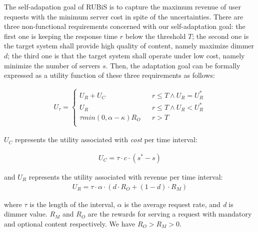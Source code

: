\documentclass[sigconf]{acmart}
\begin{document}
The self-adapation goal of RUBiS is to capture the maximum revenue of user requests with the minimum server cost in spite of the uncertainties. There are three non-functional requirements concerned with our self-adaptation goal: the first one is keeping the response time $r$ below the threshold $T$; the second one is the target system shall provide high quality of content, namely maximize dimmer $d$; the third one is that the target system shall operate under low cost, namely minimize the number of servers $s$. Then, the adaptation goal can be formally expressed as a utility function of these three requirements as follows:

\begin{equation}
\begin{aligned}
U_{\tau}=\left\{
\begin{array}{rcl}
U_{R}+U_{C} & & { r\leq T\wedge U_{R}=U_{R}^{*}} \\
U_{R} & & {r\leq T\wedge U_{R}<U_{R}^{*}}\\
\tau min(0,\alpha-\kappa)R_{O} & & {r>T}\\
\end{array} \right.
\end{aligned}
\end{equation}
	
\noindent$U_{C}$ represents the utility associated with \textit{cost} per time interval:
	
\begin{equation}
\begin{aligned}
U_{C}=\tau \cdot c\cdot (s^{*}-s)
\end{aligned}
\end{equation}

\noindent and $U_{R}$ represents the utility associated with revenue per time interval:
\begin{equation}
\begin{aligned}
U_{R}=\tau \cdot \alpha \cdot (d\cdot R_{O}+(1-d)\cdot R_{M})
\end{aligned}
\end{equation}

\noindent where $\tau$ is the length of the interval, $\alpha$ is the average request rate, and \textit{d} is dimmer value. $R_{M}$ and $R_{O}$ are the rewards for serving a request with mandatory and optional content respectively. We have $R_{O}>R_{M}>0$.
\end{document}
